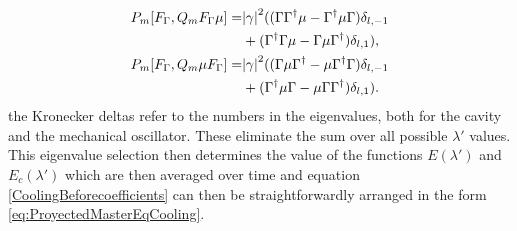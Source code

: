 \documentclass[reprint, amsmath,amssymb, aps,pra]{revtex4-1}
\begin{document}
\begin{align}\label{CoolingBeforecoefficients}
P_m[F_\Gamma,Q_m F_\Gamma \mu] =& \abs{\gamma}^2((\Gamma\Gamma^\dagger \mu - \Gamma^\dagger \mu  \Gamma)\delta_{l,-1} \\
&+ (\Gamma^\dagger\Gamma \mu - \Gamma \mu  \Gamma^\dagger)\delta_{l,1}),\nonumber \\
P_m[F_\Gamma,Q_m  \mu F_\Gamma] =& \abs{\gamma}^2((\Gamma\mu\Gamma^\dagger  - \mu\Gamma^\dagger   \Gamma)\delta_{l,-1}\\ 
&+ (\Gamma^\dagger \mu\Gamma -  \mu \Gamma \Gamma^\dagger)\delta_{l,1}). \nonumber
\end{align} the Kronecker deltas refer to the numbers in the eigenvalues, both for the cavity and the mechanical oscillator. These eliminate the sum over all possible $\lambda'$ values. This eigenvalue selection then determines the value of the functions $E(\lambda')$ and $E_c(\lambda')$ which are then averaged over time and equation \eqref{CoolingBeforecoefficients} can then be straightforwardly arranged in the form \eqref{eq:ProyectedMasterEqCooling}.



\end{document}
